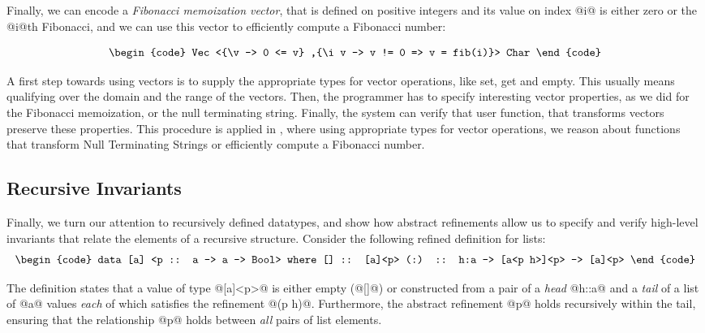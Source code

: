 Finally, we can encode a \textit{Fibonacci memoization vector}, that is defined
on positive integers and its value on index @i@ is either zero
or the @i@th Fibonacci, and we can use this vector to efficiently compute
a Fibonacci number:

$$\centering\begin{tabular}{c}\begin{code}
Vec <{\v -> 0 <= v}
    ,{\i v -> v != 0 => v = fib(i)}> Char
\end{code}\end{tabular}$$

A first step towards using vectors is 
to supply the appropriate types 
for vector operations, like 
set, get and empty.
This usually means qualifying
over the domain and the range of the vectors. 
%
Then, the programmer has to specify interesting vector properties, 
as we did for the Fibonacci memoization, or the null terminating string.
% 
Finally, the system can verify that user function, that transforms vectors
preserve these properties.
%
This procedure is applied in \cite{Vazou13},
where using appropriate types for vector operations,
we reason about functions that transform Null Terminating Strings
or efficiently compute a Fibonacci number.
%


\subsection{Recursive Invariants}
Finally, we turn our attention to recursively defined datatypes, and show 
how abstract refinements allow us to specify and verify high-level
invariants that relate the elements of a recursive structure.
Consider the following refined definition for lists:
%
$$\centering\begin{tabular}{c}\begin{code}
data [a] <p :: a -> a -> Bool> where
  []  :: [a]<p>
  (:) :: h:a -> [a<p h>]<p> -> [a]<p>
\end{code}\end{tabular}$$

The definition states that a value of type @[a]<p>@ 
is either empty (@[]@) or constructed from a pair of  
a \emph{head} @h::a@ and a \emph{tail} of a list of 
@a@ values \emph{each} of which satisfies the refinement @(p h)@. 
Furthermore, the abstract refinement @p@ holds recursively
within the tail, ensuring that the relationship @p@ 
holds between \emph{all} pairs of list elements.

